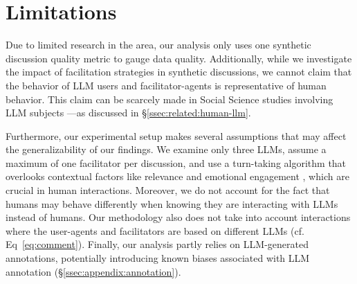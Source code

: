 %
\section{Limitations} 
\label{sec:limitations}

Due to limited research in the area, our analysis only uses one synthetic discussion quality metric to gauge data quality. Additionally, while we investigate the impact of facilitation strategies in synthetic discussions, we cannot claim that the behavior of \ac{LLM} users and facilitator-agents is representative of human behavior. This claim can be scarcely made in Social Science studies involving \ac{LLM} subjects \cite{rossi_2024, zhou-etal-2024-real}—as discussed in \S\ref{ssec:related:human-llm}.

Furthermore, our experimental setup makes several assumptions that may affect the generalizability of our findings. We examine only three \acp{LLM}, assume a maximum of one facilitator per discussion, and use a turn-taking algorithm that overlooks contextual factors like relevance and emotional engagement \cite{robert_2016_comment, Ziegele03102018}, which are crucial in human interactions. Moreover, we do not account for the fact that humans may behave differently when knowing they are interacting with \acp{LLM} instead of humans. Our methodology also does not take into account interactions where the user-agents and facilitators are based on different \acp{LLM} (cf. Eq~\ref{eq:comment}). Finally, our analysis partly relies on \ac{LLM}-generated annotations, potentially introducing known biases associated with \ac{LLM} annotation (\S\ref{ssec:appendix:annotation}).